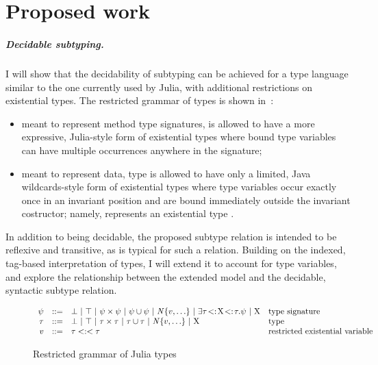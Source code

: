 \chapter{Proposed work}\label{chap:6}

\paragraph*{Decidable subtyping.}
I will show that
the decidability of subtyping can be achieved
for a type language similar to the one currently used by Julia,
with additional restrictions on existential types.
The restricted grammar of types is shown
in~:
\begin{itemize}
  \item meant to represent method type signatures, \tysig is allowed to have
  a more expressive, Julia-style form of existential types where bound type
  variables can have multiple occurrences anywhere in the signature;
  \item meant to represent data, type \ty is allowed to have only a limited,
  Java wildcards-style form of existential types where type variables
  occur exactly once in an invariant position and are bound immediately outside
  the invariant costructor; namely,  represents
  an existential type .
\end{itemize}
In addition to being decidable, the proposed subtype relation
is intended to be reflexive and transitive,
as is typical for such a relation.
Building on the indexed, tag-based interpretation of types, I will extend
it to account for type variables, and explore the relationship between
the extended model and the decidable, syntactic subtype relation.

\begin{figure}
\small
\[
\begin{array}{rcll}
  \psi & ::= &
    \bot ~\vert~ \top ~\vert~
    \psi \times \psi ~\vert~ \psi \cup \psi ~\vert~
    \mathit{N}\{v,\ldots\} ~\vert~
    \exists\tau\!<:\!\mathrm{X}\!<:\!\tau.\psi ~\vert~ \mathrm{X}
    & \text{type signature} \\
  \tau & ::= & 
    \bot ~\vert~ \top ~\vert~
    \tau \times \tau ~\vert~ \tau \cup \tau ~\vert~
    \mathit{N}\{v,\ldots\} ~\vert~ \mathrm{X}
    & \text{type} \\
  v & ::= &
    \tau<:<\tau
    & \text{restricted existential variable} \\
\end{array}
\]
\caption{Restricted grammar of Julia types}\label{fig:restricted-type-grammar}
\end{figure}

